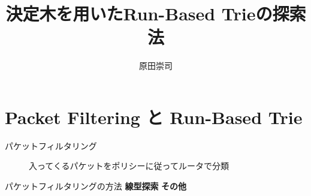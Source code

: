 \documentclass[12pt,dvipdfmx,mathserif,uplatex,aspectratio=32]{beamer}
\title{決定木を用いたRun-Based Trieの探索法}
\author[氏名略称]{原田崇司}
\institute[所属略称]{{\normalsize 神奈川大学大学院 理学研究科 情報科学専攻 田中研究室}}
\date{\empty}
\begin{document}
\begin{frame}
 \titlepage
\end{frame}
%
%

\section{Packet Filtering と Run-Based Trie}

\begin{frame}{パケットフィルタリング}
\begin{figure}
\par
\vspace{5mm}
入ってくるパケットをポリシーに従ってルータで分類
\end{figure}
\end{frame}


\begin{frame}{パケットフィルタリングの方法}
\vspace{1mm}
\hspace{1mm} {\large \textbf{線型探索}} \hspace{48mm} {\large \textbf{その他}}
\vspace{2mm}
\begin{figure}
\end{figure}
\end{frame}
\end{document}
